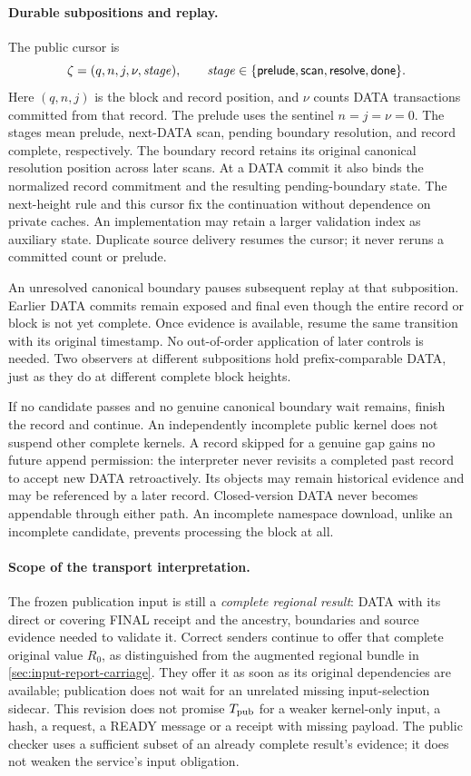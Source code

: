 \paragraph{Durable subpositions and replay.}
\label{sec:subpositions}
The public cursor is
\[
 \zeta=(q,n,j,\nu,\mathit{stage}),\qquad
 \mathit{stage}\in\{\mathsf{prelude},\mathsf{scan},\mathsf{resolve},\mathsf{done}\}.
\]
Here $(q,n,j)$ is the block and record position, and $\nu$ counts DATA
transactions committed from that record. The prelude uses the sentinel
$n=j=\nu=0$. The stages mean prelude, next-DATA scan, pending boundary
resolution, and record complete, respectively. The boundary record
retains its original canonical resolution position across later scans.
At a DATA commit it also binds the normalized record commitment and
the resulting pending-boundary state. The next-height rule and this
cursor fix the continuation without dependence on private caches.
An implementation may retain a larger validation index as auxiliary
state. Duplicate source delivery resumes the cursor; it never reruns
a committed count or prelude.

An unresolved canonical boundary pauses subsequent replay at that
subposition. Earlier DATA commits remain exposed and final even though
the entire record or block is not yet complete. Once evidence is
available, resume the same transition with its original timestamp.
No out-of-order application of later controls is needed. Two observers
at different subpositions hold prefix-comparable DATA, just as they do
at different complete block heights.

If no candidate passes and no genuine canonical boundary wait remains,
finish the record and continue. An independently incomplete public kernel
does not suspend other complete kernels. A record skipped for a genuine
gap gains no future append permission: the interpreter never revisits
a completed past record to accept new DATA retroactively. Its objects
may remain historical evidence and may be referenced by a later record.
Closed-version DATA never becomes appendable through either path.
An incomplete namespace download, unlike an incomplete candidate,
prevents processing the block at all.

\paragraph{Scope of the transport interpretation.}
\label{sec:transport-scope}
The frozen publication input is still a \emph{complete regional result}:
DATA with its direct or covering FINAL receipt and the ancestry,
boundaries and source evidence needed to validate it. Correct senders
continue to offer that complete original value $R_0$, as distinguished
from the augmented regional bundle in \cref{sec:input-report-carriage}.
They offer it as soon as its original dependencies are available;
publication does not wait for an unrelated missing input-selection sidecar.
This revision does not promise
$T_{\rm pub}$ for a weaker kernel-only input, a hash, a request, a READY
message or a receipt with missing payload. The public checker uses a
sufficient subset of an already complete result's evidence; it does not
weaken the service's input obligation.

